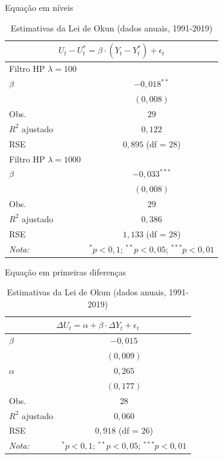 \documentclass[11pt]{beamer}
\begin{document}
\begin{frame}{Equação em níveis}

\begin{table}[H]
\centering
\caption*{Estimativas da Lei de Okun (dados anuais, 1991-2019)}
\label{tab:okun}
\begin{tabular}{lc} \\ \multicolumn{2}{c}{$U_t - U_t^* = \beta \cdot (Y_t - Y_t^*) + \epsilon_t$} \\ \toprule
Filtro HP $\lambda = 100$ &  \\
$\beta$ & $-0,018^{**}$ \\
 & $(0,008)$ \\
Obs. & $29$ \\
$R^2$ ajustado & $0,122$ \\
RSE & $0,895$ (df = $28$) \\ \midrule
Filtro HP $\lambda = 1000$ &  \\
$\beta$ & $-0,033^{***}$ \\
 & $(0,008)$ \\
Obs. & $29$ \\
$R^2$ ajustado & $0,386$ \\
RSE & $1,133$ (df = $28$) \\ \midrule
\textit{Nota:} & $^*p < 0,1$; $^{**}p < 0,05$; $^{***}p < 0,01$ \\ \bottomrule
\end{tabular}
\end{table}

\end{frame}

\begin{frame}{Equação em primeiras diferenças}

\begin{table}[H]
\centering
\caption*{Estimativas da Lei de Okun (dados anuais, 1991-2019)}
\label{tab:okun_diferenças}
\begin{tabular}{lc} \\ \multicolumn{2}{c}{$\Delta U_t = \alpha +  \beta \cdot \Delta Y_t + \epsilon_t$} \\ \toprule
$\beta$ & $-0,015$ \\
 & $(0,009)$ \\
$\alpha$ & $0,265$ \\
 & $(0,177)$ \\
Obs. & 28 \\
$R^2$ ajustado & $0,060$ \\
RSE & $0,918$ (df = $26$) \\ \midrule
\textit{Nota:} & $^*p < 0,1$; $^{**}p < 0,05$; $^{***}p < 0,01$ \\ \bottomrule
\end{tabular}
\end{table}

\end{frame}
\end{document}
